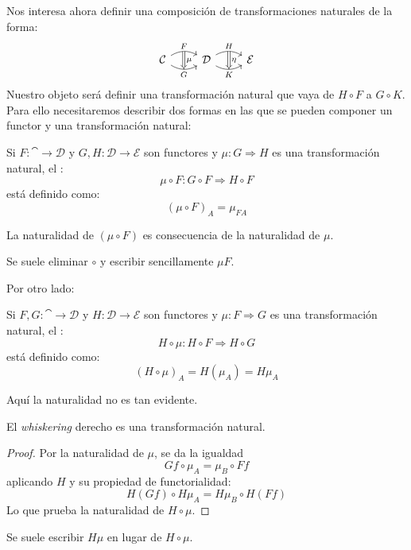 Nos interesa ahora definir una composición de transformaciones naturales de la forma:
\begin{equation}\label{ver-comp} \begin{tikzcd}{\cat} \arrow[r,"F", bend left, ""{name=FU}] \arrow[r,"G" below, bend right, ""{name=FD, below}] & \mathcal{D} \arrow[r,"H",bend left, ""{name=GU}] \arrow[r,"K" below, bend right, ""{name=GD, below}] & \mathcal{E}
\arrow[Rightarrow, from=FU, to=FD, "\mu"] \arrow[Rightarrow, from=GU, to=GD, "\eta"]\end{tikzcd}\end{equation}
Nuestro objeto será definir una transformación natural que vaya de $H \circ F$ a $G \circ K$.
Para ello necesitaremos describir dos formas en las que se pueden componer un functor y una transformación natural:
\begin{definition}
Si $F \colon \cat \to \mathcal{D}$ y $G, H\colon \mathcal{D} \to \mathcal{E}$ son functores y $\mu \colon G \Rightarrow H$ es una transformación natural, el :
\[ \mu \circ F \colon G \circ F \Rightarrow H \circ F \]
está definido como:
\[ (\mu \circ F)_A = \mu_{F A} \]
\end{definition}
La naturalidad de $(\mu \circ F)$ es consecuencia de la naturalidad de $\mu$.

Se suele eliminar $\circ$ y escribir sencillamente $\mu F$.

Por otro lado:
\begin{definition}
Si $F, G \colon \cat \to \mathcal{D}$ y $H\colon \mathcal{D} \to \mathcal{E}$ son functores y $\mu \colon F \Rightarrow G$ es una transformación natural, el :
\[ H \circ \mu  \colon H \circ F \Rightarrow H \circ G \]
está definido como:
\[ (H \circ \mu)_A = H(\mu_A) = H\mu_A \]
\end{definition}
Aquí la naturalidad no es tan evidente.
\begin{proposition}
El \emph{whiskering} derecho es una transformación natural.
\end{proposition}
\begin{proof}
Por la naturalidad de $\mu$, se da la igualdad
\[ G f \circ \mu_A = \mu_B \circ F f \]
aplicando $H$ y su propiedad de functorialidad:
\[ H(G f) \circ H\mu_A = H\mu_B \circ H(F f) \]
Lo que prueba la naturalidad de $H \circ \mu$.
\end{proof}
Se suele escribir $H\mu$ en lugar de $H \circ \mu$.

